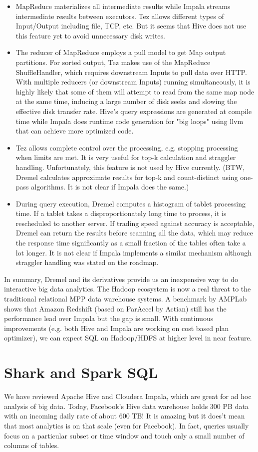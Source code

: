 \documentclass[11pt]{book}
\begin{document}
\begin{itemize}
\item MapReduce materializes all intermediate results while Impala streams intermediate results between executors. Tez allows different types of Input/Output including file, TCP, etc. But it seems that Hive does not use this feature yet to avoid unnecessary disk writes.
\item The reducer of MapReduce employs a pull model to get Map output partitions. For sorted output, Tez makes use of the MapReduce ShuffleHandler, which requires downstream Inputs to pull data over HTTP. With multiple reducers (or downstream Inputs) running simultaneously, it is highly likely that some of them will attempt to read from the same map node at the same time, inducing a large number of disk seeks and slowing the effective disk transfer rate.
Hive's query expressions are generated at compile time while Impala does runtime code generation for "big loops" using llvm that can achieve more optimized code.
\item Tez allows complete control over the processing, e.g. stopping processing when limits are met. It is very useful for top-k calculation and straggler handling. Unfortunately, this feature is not used by Hive currently. (BTW, Dremel calculates approximate results for top-k and count-distinct using one-pass algorithms. It is not clear if Impala does the same.)
\item During query execution, Dremel computes a histogram of tablet processing time. If a tablet takes a disproportionately long time to process, it is rescheduled to another server. If trading speed against accuracy is acceptable, Dremel can return the results before scanning all the data, which may reduce the response time significantly as a small fraction of the tables often take a lot longer. It is not clear if Impala implements a similar mechanism although straggler handling was stated on the roadmap.
\end{itemize}
In summary, Dremel and its derivatives provide us an inexpensive way to do interactive big data analytics. The Hadoop ecosystem is now a real threat to the traditional relational MPP data warehouse systems. A benchmark by AMPLab shows that Amazon Redshift (based on ParAccel by Actian) still has the performance lead over Impala but the gap is small. With continuous improvements (e.g. both Hive and Impala are working on cost based plan optimizer), we can expect SQL on Hadoop/HDFS at higher level in near feature.

\section{Shark and Spark SQL}
We have reviewed Apache Hive and Cloudera Impala, which are great for ad hoc analysis of big data. Today, Facebook's Hive data warehouse holds 300 PB data with an incoming daily rate of about 600 TB! It is amazing but it does't mean that most analytics is on that scale (even for Facebook). In fact, queries usually focus on a particular subset or time window and touch only a small number of columns of tables.
\end{document}

